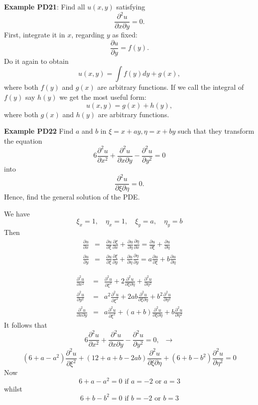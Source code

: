 \documentclass{article}
\newcommand{\pd}{\partial}
\begin{document}
\textbf{Example PD21}: Find all $u(x,y)$ satisfying
\begin{equation}\label{e1.2b}
\frac{\partial^2 u}{\partial x \partial y}= 0.
\end{equation}
First, integrate it in $x$, regarding $y$ as fixed:
$$
\frac{\partial u}{\partial y}=f(y).
$$
Do it again to obtain
$$
u(x,y)=\int f(y) d y  +g(x),
$$
where both $f(y)$ and $g(x)$ are arbitrary functions. If we call the integral of $f(y)$ say $h(y)$ we get the most useful form:
$$
u(x,y)=g(x) + h(y) ,
$$
where both $g(x)$ and $h(y)$ are arbitrary functions.


\textbf{Example PD22} Find $a$ and $b$ in $\xi=x+ay, \eta=x+by$ such that they transform the equation
 $$
 6 \frac{\partial^2 u}{\partial x^2} +  \frac{\partial^2 u}{\partial x \partial y}
 - \frac{\partial^2 u}{\partial y^2} =0
$$
into
$$
 \frac{\partial^2 u }{\partial \xi \partial \eta} = 0.
$$
Hence, find the general solution of the PDE.

We have
$$
\xi_x=1, \quad \eta_x=1, \quad \xi_y=a, \quad \eta_y=b
$$
Then
{\small
$$
\begin{array}{lll}
\frac{\pd u}{\pd x}&=&\frac{\pd u}{\pd \xi}\frac{\pd \xi}{\pd
x}+\frac{\pd u}{\pd \eta}\frac{\pd \eta}{\pd x}=\frac{\pd u}{\pd
\xi} +\frac{\pd u}{\pd \eta} \\
\frac{\pd u}{\pd y}&=& \frac{\pd u}{\pd \xi}\frac{\pd \xi}{\pd
y}+\frac{\pd u}{\pd \eta}\frac{\pd \eta}{\pd y}=a\frac{\pd u}{\pd
\xi} + b\frac{\pd u}{\pd \eta}
\end{array}
$$
}


$$
\begin{array}{lll}
\frac{\pd^2 u}{\pd x^2}&=&\frac{\pd^2 u}{\pd \xi^2} + 2
\frac{\pd^2 u}{\pd \xi \pd \eta}+\frac{\pd^2 u}{\pd \eta^2} \\
\frac{\pd^2 u}{\pd y^2}&=& a^2 \frac{\pd^2 u}{\pd \xi^2} + 2ab
\frac{\pd^2 u}{\pd \xi \pd \eta}+ b^2 \frac{\pd^2 u}{\pd \eta^2} \\
\frac{\pd^2 u}{\pd x \pd y}&=& a \frac{\pd^2 u}{\pd \xi^2} + (a+b)
\frac{\pd^2 u}{\pd \xi \pd \eta}+ b \frac{\pd^2 u}{\pd \eta^2}
\end{array}
$$
It follows that
$$
6 \frac{\partial^2 u}{\partial x^2} +  \frac{\partial^2
u}{\partial x \partial y}
 - \frac{\partial^2 u}{\partial y^2}=0, \;\;  \to
$$
$$
( 6+ a-a^2) \frac{\pd^2 u}{\pd \xi^2} +( 12+a+b -2ab) \frac{\pd^2
u}{\pd \xi \pd \eta} + (6+b-b^2) \frac{\pd^2 u}{\pd \eta^2}= 0
$$
Now 
$$
6+ a-a^2 = 0 \mbox{ if } a = - 2 \mbox{ or } a = 3
$$
whilst 
$$
6+ b-b^2 = 0 \mbox{ if } b = - 2 \mbox{ or } b = 3
$$
\end{document}
